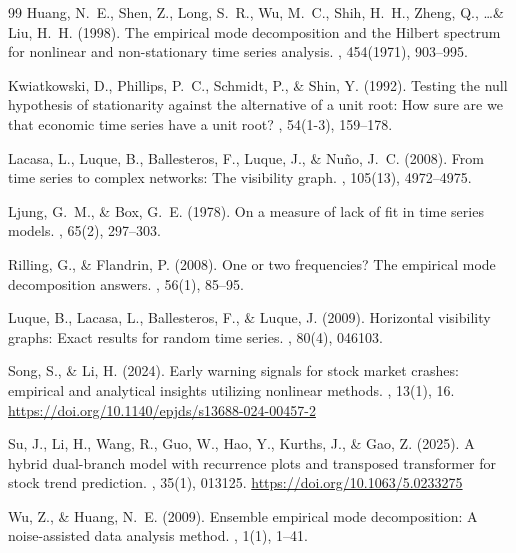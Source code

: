 \documentclass[11pt,a4paper]{article}
\begin{document}
\begin{thebibliography}{99}
Huang, N.~E., Shen, Z., Long, S.~R., Wu, M.~C., Shih, H.~H., Zheng, Q., \ldots \& Liu, H.~H. (1998).
\newblock The empirical mode decomposition and the Hilbert spectrum for nonlinear and non-stationary time series analysis.
, 454(1971), 903--995.

Kwiatkowski, D., Phillips, P.~C., Schmidt, P., \& Shin, Y. (1992).
\newblock Testing the null hypothesis of stationarity against the alternative of a unit root: How sure are we that economic time series have a unit root?
, 54(1-3), 159--178.

Lacasa, L., Luque, B., Ballesteros, F., Luque, J., \& Nuño, J.~C. (2008).
\newblock From time series to complex networks: The visibility graph.
, 105(13), 4972--4975.

Ljung, G.~M., \& Box, G.~E. (1978).
\newblock On a measure of lack of fit in time series models.
, 65(2), 297--303.

Rilling, G., \& Flandrin, P. (2008).
\newblock One or two frequencies? The empirical mode decomposition answers.
, 56(1), 85--95.

Luque, B., Lacasa, L., Ballesteros, F., \& Luque, J. (2009).
\newblock Horizontal visibility graphs: Exact results for random time series.
, 80(4), 046103.

Song, S., \& Li, H. (2024).
\newblock Early warning signals for stock market crashes: empirical and analytical insights utilizing nonlinear methods.
, 13(1), 16.
\newblock \url{https://doi.org/10.1140/epjds/s13688-024-00457-2}

Su, J., Li, H., Wang, R., Guo, W., Hao, Y., Kurths, J., \& Gao, Z. (2025).
\newblock A hybrid dual-branch model with recurrence plots and transposed transformer for stock trend prediction.
, 35(1), 013125.
\newblock \url{https://doi.org/10.1063/5.0233275}

Wu, Z., \& Huang, N.~E. (2009).
\newblock Ensemble empirical mode decomposition: A noise-assisted data analysis method.
, 1(1), 1--41.


\end{thebibliography}
\end{document}
